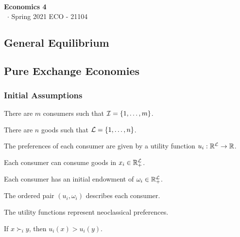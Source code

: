 \documentclass[8pt,a4paper]{extarticle}
\renewcommand{\csClass}{Economics 4}
\renewcommand{\csClassCode}{ECO - 21104}
\renewcommand{\csTerm}{Spring 2021}
\begin{document}
\begin{titlepage}
  \begin{center}
    \vspace*{1cm}
    \Huge
    \textbf{\csClass}
    \vspace{0.5cm} \\
    \Large
    \cs\ $\cdot$ \csTerm
    \vfill
    \csAuthorName
    \vspace{0.8cm}
    \csClassCode\\
    \csSchool
  \end{center}
\end{titlepage}

\begin{multicols}{3}
  \setcounter{page}{1}

  \section{General Equilibrium}

  \subsection{Pure Exchange Economies}

  \subsubsection*{Initial Assumptions}

  \begin{bulletlist}
    \item There are $m$ consumers such that $\mathcal{I} = \{1, \ldots, m\}$.
    \item There are $n$ goods such that $\mathcal{L} = \{1, \ldots, n\}$.
    \item The preferences of each consumer are given by a utility function $u_i : \mathbb{R}^{\mathcal{L}} \to \mathbb{R}$.
    \item Each consumer can consume goods in $x_i \in \mathbb{R}_+^{\mathcal{L}}$.
    \item Each consumer has an initial endowment of $\omega_i \in \mathbb{R}_+^{\mathcal{L}}$.
    \item The ordered pair $(u_i, \omega_i)$ describes each consumer.
    \item The utility functions represent neoclassical preferences.
  \end{bulletlist}

  \begin{boxprop}
    If $x \succ_i y$, then $u_i(x) > u_i(y)$.
  \end{boxprop}


\end{multicols}
\end{document}
